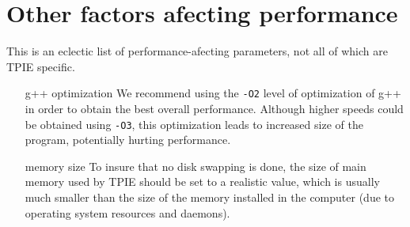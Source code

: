 \section{Other factors afecting performance}

This is an eclectic list of performance-afecting parameters, not all of
which are TPIE specific.
\begin{itemize}
\item[g++ optimization] We recommend using the \verb|-O2| level of
optimization of g++ in order to obtain the best overall
performance. Although higher speeds could be obtained using \verb|-O3|,
this optimization leads to increased size of the program, potentially
hurting performance. 
\item[memory size] To insure that no disk swapping is done, the size of
main memory used by TPIE should be set to a realistic value, which is
usually much smaller than the size of the memory installed in the computer
(due to operating system resources and daemons).
\end{itemize}

